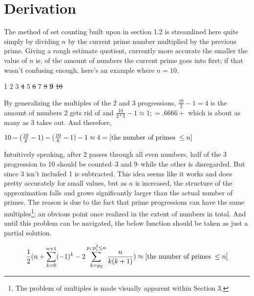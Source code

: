 \documentclass[12pt, letterpaper, twosided]{report}
\begin{document}
\section{Derivation}
\hspace{0.5cm}The method of set counting built upon in section 1.2 is streamlined here quite simply by dividing $n$ by the current prime number multiplied by the previous prime. Giving a rough estimate quotient, currently more accurate the smaller the value of $n$ is, of the amount of numbers the current prime goes into first; if that wasn't confusing enough, here's an example where $n = 10$.
\begin{center}
1 \hspace{0.5cm}2 \hspace{0.5cm}3 \hspace{0.5cm}\sout{4} \hspace{0.5cm}5 \hspace{0.5cm}\sout{6} \hspace{0.5cm}7 \hspace{0.5cm}\sout{8} \hspace{0.5cm}\textbf{9} \hspace{0.5cm}\sout{10}
\end{center}
By generalizing the multiples of the 2 and 3 progressions, $\frac{10}{2} - 1 = 4$ is the amount of numbers 2 gets rid of and $\frac{10}{2*3} - 1 \approx 1; = .6666+$ which is about as many as 3 takes out. And therefore,
\begin{center}
$10 - (\frac{10}{2} - 1)  - (\frac{10}{6} - 1) - 1 \approx 4 =  [\text{the number of primes}\hspace{0.1cm}\leq n]$
\end{center}
Intuitively speaking, after 2 passes through all even numbers, half of the 3 progression to 10 should be counted--3 and 9--while the other is disregarded. But since 3 isn't included 1 is subtracted. This idea seems like it works and does pretty accurately for small values, but as $n$ is increased, the structure of the approximation falls and grows significantly larger than the actual number of primes. The reason is due to the fact that prime progressions can have the same multiples\footnote{The problem of multiples is made visually apparent within Section 3.}; an obvious point once realized in the extent of numbers in total. And until this problem can be navigated, the below function should be taken as just a partial solution.

$$\frac{1}{2}(n+\sum_{k=0}^{n+1}(-1)^{k}-2\sum_{k=p_{2}}^{p_{i};p_{i}^{2}\leq n}\frac{n}{k(k+1)}) \approx [\text{the number of primes}\hspace{0.1cm}\leq n]$$
\end{document}
